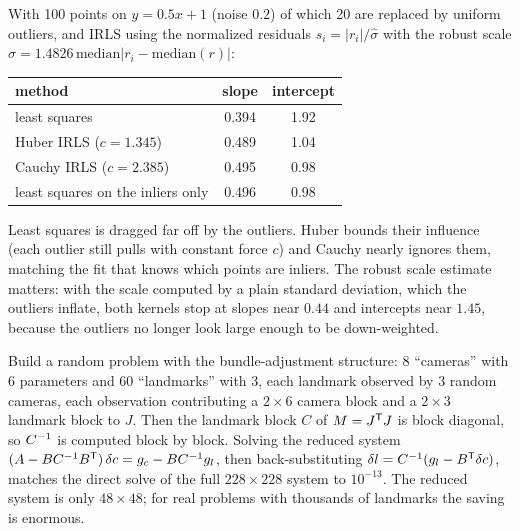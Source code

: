 \begin{solutions}
  \item With 100 points on $y = 0.5x + 1$ (noise $0.2$) of which 20 are replaced by uniform outliers, and IRLS using the normalized residuals
        $s_i = |r_i|/\hat\sigma$ with the robust scale $\hat\sigma = 1.4826\,\mathrm{median}|r_i - \mathrm{median}(r)|$:
        \begin{center}\small
        \begin{tabular}{@{}l c c@{}}
        \toprule
        method & slope & intercept \\
        \midrule
        least squares & 0.394 & 1.92 \\
        Huber IRLS ($c = 1.345$) & 0.489 & 1.04 \\
        Cauchy IRLS ($c = 2.385$) & 0.495 & 0.98 \\
        least squares on the inliers only & 0.496 & 0.98 \\
        \bottomrule
        \end{tabular}
        \end{center}
        Least squares is dragged far off by the outliers. Huber bounds their influence (each outlier still pulls with constant force $c$) and Cauchy
        nearly ignores them, matching the fit that knows which points are inliers. The robust scale estimate matters: with the scale computed by a
        plain standard deviation, which the outliers inflate, both kernels stop at slopes near $0.44$ and intercepts near $1.45$, because the
        outliers no longer look large enough to be down-weighted.

  \item Build a random problem with the bundle-adjustment structure: 8 ``cameras'' with 6 parameters and 60 ``landmarks'' with 3, each landmark
        observed by 3 random cameras, each observation contributing a $2\times6$ camera block and a $2\times3$ landmark block to $J$. Then the landmark block $C$
        of $M = J^{\mathsf{T}} J$ is block diagonal, so $C^{-1}$ is computed block by block. Solving the reduced system
        $(A - BC^{-1} B^{\mathsf{T}})\,\delta c = g_c - BC^{-1} g_l$, then back-substituting $\delta l = C^{-1}(g_l - B^{\mathsf{T}}\delta c)$, matches the direct solve of the full
        $228\times228$ system to $10^{-13}$. The reduced system is only $48\times48$; for real problems with thousands of landmarks the saving is enormous.


\end{solutions}
